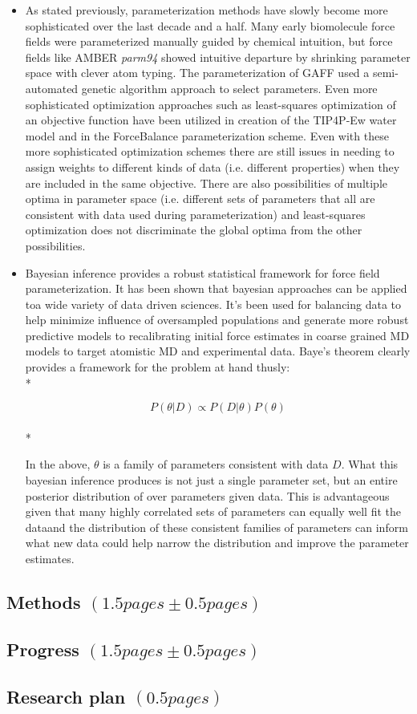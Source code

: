 \documentclass[aps,pre,onecolumn,nofootinbib,superscriptaddress,linenumbers,12pt,draft,tightenlines,notitlepage]{revtex4-1}
\begin{document}
\begin{itemize}
 \item As stated previously, parameterization methods have slowly become more sophisticated over the last decade and a half. Many early biomolecule force fields were parameterized manually guided by chemical intuition, but force fields like AMBER \textit{parm94} showed intuitive departure by shrinking parameter space with clever atom typing.\cite{parm94} The parameterization of GAFF used a semi-automated genetic algorithm approach to select parameters.\cite{amber} Even more sophisticated optimization approaches such as least-squares optimization of an objective function have been utilized in creation of the TIP4P-Ew water model\cite{tip4pew} and in the ForceBalance parameterization scheme\cite{FB1,FB2,FB3}. Even with these more sophisticated optimization schemes there are still issues in needing to assign weights to different kinds of data (i.e. different properties) when they are included in the same objective. There are also possibilities of multiple optima in parameter space (i.e. different sets of parameters that all are consistent with data used during parameterization) and least-squares optimization does not discriminate the global optima from the other possibilities.           
 \item Bayesian inference provides a robust statistical framework for force field parameterization. It has been shown that bayesian approaches can be applied toa wide variety of data driven sciences. It's been used for balancing data to help minimize influence of oversampled populations and generate more robust predictive models\cite{bayes_imbalance} to recalibrating initial force estimates in coarse grained MD models to target atomistic MD and experimental data\cite{bayes_coarse}. Baye's theorem clearly provides a framework for the problem at hand thusly:\\*

\begin{equation} P\left(\theta|D\right) \propto P\left(D|\theta\right) P\left(\theta\right)\end{equation}\\*

In the above, $\theta$ is a family of parameters consistent with data $D$. What this bayesian inference produces is not just a single parameter set, but an entire posterior distribution of over parameters given data. This is advantageous given that many highly correlated sets of parameters can equally well fit the dataand the distribution of these consistent families of parameters can inform what new data could help narrow the distribution and improve the parameter estimates.   
\end{itemize}

\subsection{Methods $\left(1.5 pages \pm 0.5 pages\right)$}

\subsection{Progress $\left(1.5 pages \pm 0.5 pages\right)$}

\subsection{Research plan $\left(0.5 pages\right)$}



\end{document}
